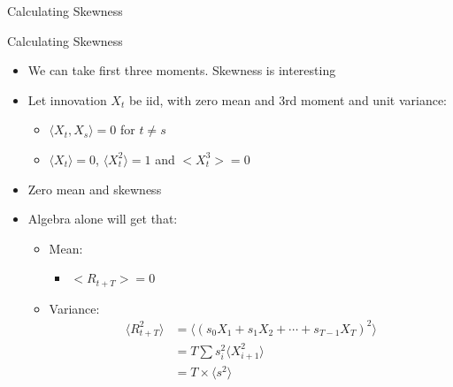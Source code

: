 \begin{frame}{Calculating Skewness }
\begin{alertblock}{Calculating Skewness}
    
    \begin{itemize}
    \item  We can take first three moments. Skewness is interesting
    \item Let innovation $X_t$ be iid, with zero mean and 3rd moment and unit variance: 
    \begin{itemize}
        \item $\langle X_t,X_s \rangle =0 $  for $t\neq s$
        \item $\langle X_t \rangle=0$, $\langle X_t^2 \rangle =1 $ and $< X_t^3 >=0 $ 
    \end{itemize}
    \item  Zero mean and skewness
     \item Algebra alone will get that:
     \begin{itemize}
        \item Mean: 
        \begin{itemize}
            \item $ < R_{t+T} >= 0 $
        \end{itemize}
        
        \item Variance: 
        \begin{align*}
            \langle R_{t+T}^2 \rangle& = \langle (s_0 X_1+ s_1 X_2+\cdots+ s_{T-1}X_T)^2 \rangle\\
            &= T\sum s_i^2 \langle X_{i+1}^2\rangle \\
            & = T\times\langle s^2\rangle
        \end{align*}
        \end{itemize}
    \end{itemize}
\end{alertblock}
\end{frame}


